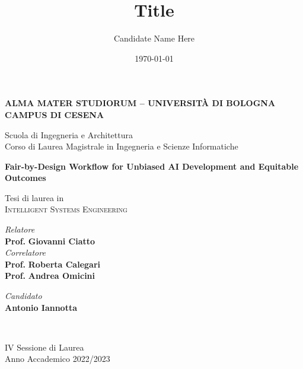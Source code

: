 \title{Title}
\author{Candidate Name Here}
\date{\today}

\begin{titlepage}
	\begin{center}
		
		\large
		\textbf{ALMA MATER STUDIORUM -- UNIVERSITÀ DI BOLOGNA \\ CAMPUS DI CESENA}
		\\
		\noindent\hrulefill
		\vspace{0.4cm}
		
		\Large
		Scuola di Ingegneria e Architettura \\
		Corso di Laurea Magistrale in Ingegneria e Scienze Informatiche
		
		\Huge
		\vspace{4cm}
		\textbf{
			Fair-by-Design Workflow for Unbiased AI Development and Equitable Outcomes
		}
		
		\large
		\vspace{1cm}
		Tesi di laurea in 
		\\
		\textsc{Intelligent Systems Engineering}
		
		\vspace{5.5cm}
		\begin{minipage}[t]{0.64\textwidth}
			\begin{flushleft}
				\textit{Relatore} 
				\\ 
				\textbf{Prof.} \textbf{Giovanni Ciatto}
				\\
				\vspace{0.4cm}
				\textit{Correlatore} 
				\\
				\textbf{Prof.} \textbf{Roberta Calegari}
				\\
				\textbf{Prof.} \textbf{Andrea Omicini}
			\end{flushleft}
		\end{minipage}
		\begin{minipage}[t]{0.34\textwidth}
			\begin{flushright}
				\textit{Candidato} 
				\\ 
				\textbf{Antonio Iannotta}
			\end{flushright}
		\end{minipage}\\
		
		\vfill
		\noindent\hrulefill
		\vspace{0.3cm}
		\Large
		
		IV Sessione di Laurea
		\\
		Anno Accademico 2022/2023
	\end{center}
\end{titlepage}
\restoregeometry

